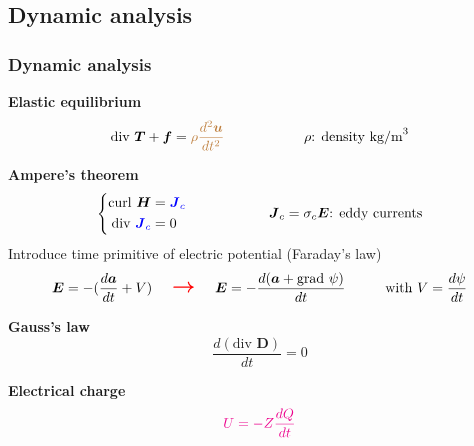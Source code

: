 \documentclass[compress]{beamer}
\begin{document}
\subsection{Dynamic analysis}
\begin{frame}\frametitle{Dynamic analysis}
\begin{itemize}[label=$\bullet$, font=\small, leftmargin=*]
\item \textbf{Elastic equilibrium}
\begin{equation*}
	\text{div }\boldsymbol{T} + \boldsymbol{f} = {\color{brown} \rho \frac{d^2 \boldsymbol{u}}{dt^2} }
	\hspace{2cm} \rho \text{: density kg/m}^3
	\end{equation*}

\item \textbf{Ampere's theorem}
\begin{equation*}
				\left\{ 
				\begin{aligned}
				\text{curl } \boldsymbol{H} & = {\color{blue}\boldsymbol{J}_c} \\
				\text{div } {\color{blue}\boldsymbol{J}_c} & = 0
        		\end{aligned}
				\right.
				\hspace{2cm} \boldsymbol{J}_c = \sigma_c \boldsymbol{E} \text{: eddy currents}
	\end{equation*}
Introduce time primitive of electric potential (Faraday's law)
\begin{equation*}
\boldsymbol{E} = - (\frac{d\boldsymbol{a}}{dt}+V) \hspace{0.5cm} {\color{red} \Large \mathbf{\boldsymbol{\rightarrow}}} \hspace{0.5cm} \boldsymbol{E} = - \frac{d(\boldsymbol{a}+ \text{grad }\psi)}{dt}
\hspace{1cm} \text{with } V=\frac{d \psi}{dt}
\end{equation*}
\begin{minipage}{0.5\linewidth}
\item \textbf{Gauss's law} \vspace*{-0.5\baselineskip}
\begin{equation*}
\frac{d(\text{div } \boldsymbol{D})}{dt} = 0
\end{equation*}
\end{minipage}
\begin{minipage}{0.45\linewidth}
\item \textbf{Electrical charge} \vspace*{-0.5\baselineskip}
\begin{equation*}
{\color{magenta}U = -Z \frac{dQ}{dt}}
\end{equation*}
\end{minipage}
\end{itemize}
\end{frame}
\end{document}
